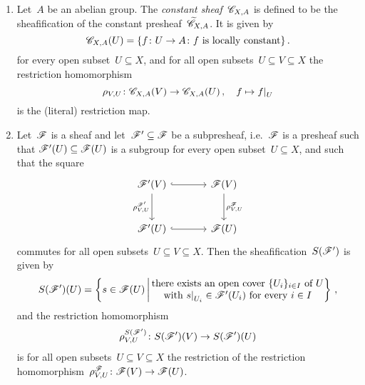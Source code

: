 \begin{example}
\begin{enumerate}
      \begin{examplenonum}[Sheafificaton]
        \leavevmode
        \begin{enumerate}
          \item
            Let~$A$ be an abelian group.
            The \emph{constant sheaf}~$\mathscr{C}_{X,A}$ is defined to be the sheafification of the constant presheaf~$\widetilde{\mathscr{C}}_{X,A}$.
            It is given by
            \[
                \mathscr{C}_{X,A}(U)
              = \{
                  f \colon U \to A
                \colon
                  \text{$f$ is locally constant}
                \} \,.
            \]
            for every open subset~$U \subseteq X$, and for all open subsets~$U \subseteq V \subseteq X$ the restriction homomorphism
            \[
                      \rho_{V,U}
              \colon  \Cs_{X,A}(V)
              \to     \Cs_{X,A}(U) \,,
              \quad   f
              \mapsto \restrict{f}{U}
            \]
            is the (literal) restriction map.
          \item
            Let~$\mathscr{F}$ is a sheaf and let~$\mathscr{F}' \subseteq \mathscr{F}$ be a subpresheaf, i.e.~$\mathscr{F}$ is a presheaf such that $\mathscr{F}'(U) \subseteq \mathscr{F}(U)$ is a subgroup for every open subset~$U \subseteq X$, and such that the square
            \[
              \begin{tikzcd}[sep = large]
                  \Fs'(V)
                  \arrow[hook]{r}
                  \arrow{d}[left]{\rho^{\Fs'}_{V,U}}
                & \Fs(V)
                  \arrow{d}[right]{\rho^\Fs_{V,U}}
                \\
                  \Fs'(U)
                  \arrow[hook]{r}
                & \Fs(U)
              \end{tikzcd}
            \]
            commutes for all open subsets~$U \subseteq V \subseteq X$.
            Then the sheafification~$S(\mathscr{F}')$ is given by
            \[
                S(\Fs')(U)
              = \left\{
                  s \in \Fs(U)
                \suchthat*
                  \begin{tabular}{@{}c@{}}
                    there exists an open cover~$\{U_i\}_{i \in I}$ of~$U$ \\
                    with~$\restrict{s}{U_i} \in \Fs'(U_i)$ for every~$i\in I$
                  \end{tabular}
                \right\} \,,
            \]
            and the restriction homomorphism
            \[
                      \rho_{V,U}^{S(\mathscr{F}')}
              \colon  S(\mathscr{F}')(V)
              \to     S(\mathscr{F}')(U)
            \]
            is for all open subsets~$U \subseteq V \subseteq X$ the restriction of the restriction homomorphism~$\rho_{V,U}^{\mathscr{F}} \colon \mathscr{F}(V) \to \mathscr{F}(U)$.
            

\end{enumerate}
\end{examplenonum}
\end{enumerate}
\end{example}
